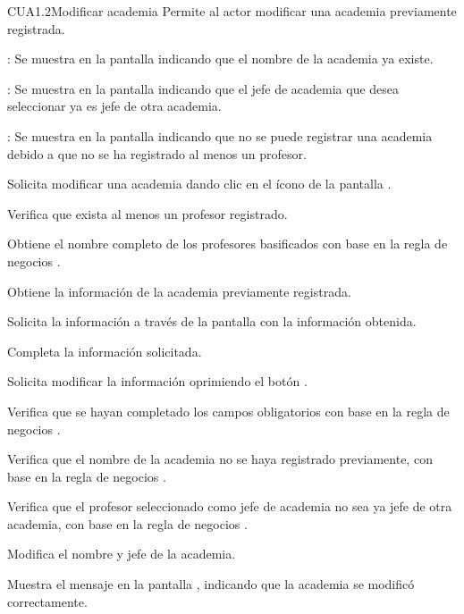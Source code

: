 \begin{UseCase}{CUA1.2}{Modificar academia}{	
	Permite al actor modificar una academia previamente registrada.
}
{\begin{UClist}
			\UCli {}: Se muestra en la pantalla  indicando que el nombre de la academia ya existe.
			
			\UCli {}: Se muestra en la pantalla  indicando que el jefe de academia que desea seleccionar ya es jefe de otra academia.
			
			\UCli {}: Se muestra en la pantalla  indicando que no se puede registrar una academia debido a que no se ha registrado al menos un profesor.
		\end{UClist}
	}
\end{UseCase}

\begin{UCtrayectoria}
	\UCpaso [\UCactor] Solicita modificar una academia dando clic en el ícono %
	de la pantalla . 
	
	\UCpaso [\UCsist] Verifica que exista al menos un profesor registrado. 
	
	\UCpaso [\UCsist] Obtiene el nombre completo de los profesores basificados con base en la regla de negocios .
	
	\UCpaso [\UCsist] Obtiene la información de la academia previamente registrada.

	\UCpaso[\UCsist] Solicita la información a través de la pantalla  con la información obtenida.
	
	\UCpaso [\UCactor] Completa la información solicitada. \label{CUA1.1:CompletaInfo}
	
	\UCpaso [\UCactor] Solicita modificar la información oprimiendo el botón . 
	
	\UCpaso [\UCsist] Verifica que se hayan completado los campos obligatorios con base en la regla de negocios . 
	
	\UCpaso [\UCsist] Verifica que el nombre de la academia no se haya registrado previamente, con base en la regla de negocios . 
		
	\UCpaso [\UCsist] Verifica que el profesor seleccionado como jefe de academia no sea ya jefe de otra academia, con base en la regla de negocios . 
	
	\UCpaso [\UCsist] Modifica el nombre y jefe de la academia.
	
	\UCpaso [\UCsist] Muestra el mensaje  en la pantalla , indicando que la academia se modificó correctamente.	
	
\end{UCtrayectoria}

